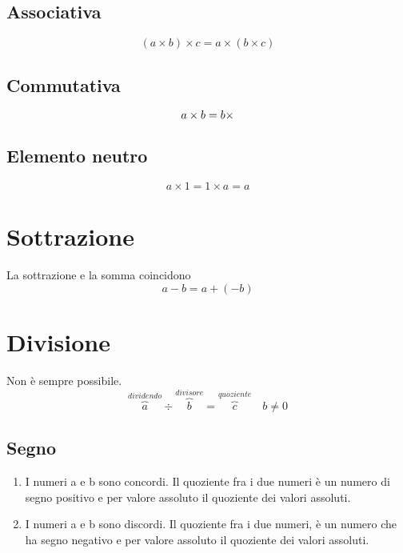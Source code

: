 \subsection{Associativa}
\begin{equation}
(a\times b)\times c=a\times(b\times c) 
\end{equation}
\subsection{Commutativa}
\begin{equation}
a\times b=b\times \index{Numero!intero!prodotto commutativa}
\end{equation}
\subsection{Elemento neutro}
\begin{equation}
a\times 1=1\times a=a
\end{equation}
\section{Sottrazione}
La sottrazione e la somma coincidono
\begin{equation}
a-b=a+(-b)
\end{equation}
 \section{Divisione}
  Non è sempre possibile.
\begin{equation}
\overbrace{a}^{dividendo}\div\overbrace{b}^{divisore}=\overbrace{c}^{quoziente}\quad b\neq 0
\end{equation}
\subsection{Segno}
\begin{enumerate}
	\item I numeri a e b sono concordi. Il quoziente fra i due numeri è un numero di segno positivo e per valore assoluto il quoziente dei valori assoluti.
	\item I numeri a e b sono discordi. Il quoziente fra i due numeri, è un numero che ha  segno negativo e per valore assoluto il quoziente dei valori assoluti.
\end{enumerate}
